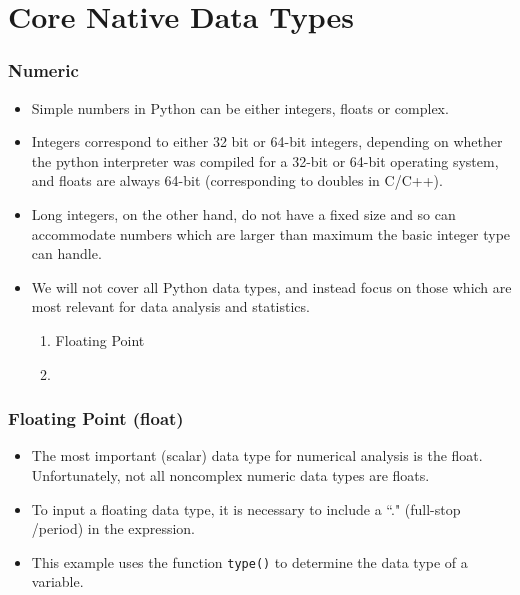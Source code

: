 \documentclass[KSmainSlides.tex]{subfiles}
\begin{document}
\section{Core Native Data Types}
\begin{frame}[fragile]

\frametitle{ Numeric}
\begin{itemize}
\item Simple numbers in Python can be either integers, floats or complex. 
\item Integers correspond to either 32
bit or 64-bit integers, depending on whether the python interpreter was compiled for a 32-bit or 64-bit
operating system, and floats are always 64-bit (corresponding to doubles in C/C++). 

\item Long integers, on the
other hand, do not have a fixed size and so can accommodate numbers which are larger than maximum
the basic integer type can handle. 
\end{itemize}
\end{frame}
\begin{frame}[fragile]
\begin{itemize}
\item We will not cover all Python data types, and instead focus
on those which are most relevant for data analysis and statistics. 
\begin{enumerate}
	\item Floating Point
	\item 
\end{enumerate}
\end{itemize}
\end{frame}
\begin{frame}[fragile]
\frametitle{Floating Point (float)}
\begin{itemize}
\item The most important (scalar) data type for numerical analysis is the float. Unfortunately, not all noncomplex
numeric data types are floats. 
\item To input a floating data type, it is necessary to include a ``." (full-stop /period) in the expression. 
\item This example uses the function \texttt{type()} to determine the data type of a variable.
\end{itemize}


\end{frame}
\end{document}
